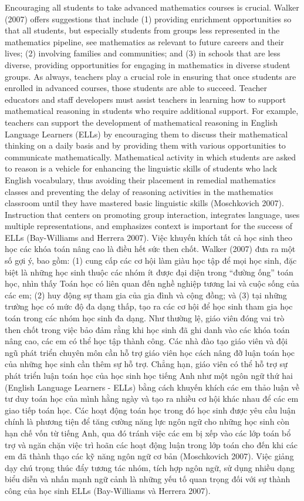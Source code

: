 \documentclass[
  10pt,
  a4paper,
  landscape,
  twoside,
  openany
]{scrbook}
\newcommand{\EN}[1]{#1}
\newcommand{\VI}[1]{#1}
\newcounter{example}
\begin{document}
\TriPara
{
\EN{Encouraging all students to take advanced mathematics courses is crucial. Walker (2007) offers suggestions that include (1) providing enrichment opportunities so that all students, but especially students from groups less represented in the mathematics pipeline, see mathematics as relevant to future careers and their lives; (2) involving families and communities; and (3) in schools that are less diverse, providing opportunities for engaging in mathematics in diverse student groups. As always, teachers play a crucial role in ensuring that once students are enrolled in advanced courses, those students are able to succeed. Teacher educators and staff developers must assist teachers in learning how to support mathematical reasoning in students who require additional support. For example, teachers can support the development of mathematical reasoning in English Language Learners (ELLs) by encouraging them to discuss their mathematical thinking on a daily basis and by providing them with various opportunities to communicate mathematically. Mathematical activity in which students are asked to reason is a vehicle for enhancing the linguistic skills of students who lack English vocabulary, thus avoiding their placement in remedial mathematics classes and preventing the delay of reasoning activities in the mathematics classroom until they have mastered basic linguistic skills (Moschkovich 2007). Instruction that centers on promoting group interaction, integrates language, uses multiple  representations, and emphasizes context is important for the success of ELLs (Bay-Williams and Herrera 2007).}
}
{
\VI{Việc khuyến khích tất cả học sinh theo học các khóa toán nâng cao là điều hết sức then chốt. Walker (2007) đưa ra một số gợi ý, bao gồm: (1) cung cấp các cơ hội làm giàu học tập để mọi học sinh, đặc biệt là những học sinh thuộc các nhóm ít được đại diện trong “đường ống” toán học, nhìn thấy Toán học có liên quan đến nghề nghiệp tương lai và cuộc sống của các em; (2) huy động sự tham gia của gia đình và cộng đồng; và (3) tại những trường học có mức độ đa dạng thấp, tạo ra các cơ hội để học sinh tham gia học toán trong các nhóm học sinh đa dạng. Như thường lệ, giáo viên đóng vai trò then chốt trong việc bảo đảm rằng khi học sinh đã ghi danh vào các khóa toán nâng cao, các em có thể học tập thành công. Các nhà đào tạo giáo viên và đội ngũ phát triển chuyên môn cần hỗ trợ giáo viên học cách nâng đỡ luận toán học của những học sinh cần thêm sự hỗ trợ. Chẳng hạn, giáo viên có thể hỗ trợ sự phát triển luận toán học của học sinh học tiếng Anh như một ngôn ngữ thứ hai (English Language Learners - ELLs) bằng cách khuyến khích các em thảo luận về tư duy toán học của mình hằng ngày và tạo ra nhiều cơ hội khác nhau để các em giao tiếp toán học. Các hoạt động toán học trong đó học sinh được yêu cầu luận chính là phương tiện để tăng cường năng lực ngôn ngữ cho những học sinh còn hạn chế vốn từ tiếng Anh, qua đó tránh việc các em bị xếp vào các lớp toán bổ trợ và ngăn chặn việc trì hoãn các hoạt động luận trong lớp toán cho đến khi các em đã thành thạo các kỹ năng ngôn ngữ cơ bản (Moschkovich 2007). Việc giảng dạy chú trọng thúc đẩy tương tác nhóm, tích hợp ngôn ngữ, sử dụng nhiều dạng biểu diễn và nhấn mạnh ngữ cảnh là những yếu tố quan trọng đối với sự thành công của học sinh ELLs (Bay-Williams và Herrera 2007).}
}
\end{document}
